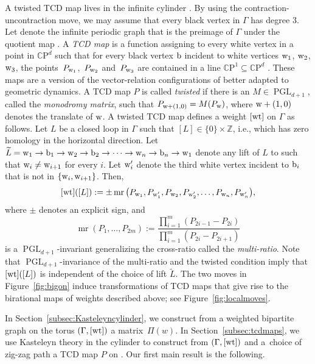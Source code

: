 \documentclass[pdftex]{sigma}
\numberwithin{equation}{section}
\newcommand{\Z}{{\mathbb Z}}
\newcommand{\R}{{\mathbb R}}
\newcommand{\CP}{{\mathbb C\mathrm P}}
\newcommand{\T}{{\mathbb T}}
\newcommand{\A}{{\mathbb A}}
\newcommand{\PGL}{\operatorname{PGL}}
\newcommand{\ra}{\rightarrow}
\newcommand{\w}{{\rm w}}
\newcommand{\bw}{{\rm b}}
\newcommand{\wt}{{\rm wt}}
\def\mr{\operatorname{mr}}
\begin{document}
	A twisted TCD map lives in the infinite cylinder \smash{$\widehat \A:= \R^2/\Z(0,1)$}. By using the contraction-uncontraction move, we may assume that every black vertex in $\Gamma$ has degree $3$. Let \smash{$\Gamma_{\widehat \A}$} denote the infinite periodic graph that is the preimage of $\Gamma$ under the quotient map \smash{$\widehat \A\ra \T$}. A \textit{TCD map} is a function \smash{$P\colon W\bigl(\Gamma_{\widehat \A}\bigr) \ra \CP^d$} assigning to every white vertex in \smash{$\Gamma_{\widehat \A}$} a point in $\CP^d$ such that for every black vertex $\bw$ incident to white vertices $\w_1$, $\w_2$, $\w_3$, the points~$P_{\w_1}$,~$P_{\w_2}$ and~$P_{\w_3}$ are contained in a line $\CP^1 \subseteq \CP^d$ \cite{AGR}. These maps are a version of the vector-relation configurations of \cite{AGPR} better adapted to geometric dynamics. A TCD map $P$ is called \textit{twisted} if there is an $M \in \PGL_{d+1}$, called the \textit{monodromy matrix}, such that $P_{\w+(1,0)} = M(P_\w)$, where $\w+(1,0)$ denotes the translate of $\w$.
	A twisted TCD map defines a weight $[\wt]$ on $\Gamma$ as follows. Let $L$ be a closed loop in $\Gamma$ such that $[L] \in \{0\} \times \Z$, i.e., which has zero homology in the horizontal direction. Let $\widetilde L={\rm w}_1 \ra {\rm b}_1 \ra {\rm w}_2 \ra {\rm b}_2 \ra \cdots \ra {\rm w}_n \ra {\rm b}_n \ra {\rm w}_1$ denote any lift of $L$ to \smash{$\Gamma_{\widehat \A}$} such that ${\rm w}_i \neq {\rm w}_{i+1}$ for every $i$. Let ${\rm w}_i'$ denote the third white vertex incident to ${\rm b}_i$ that is not in $\{{\rm w}_i,{\rm w}_{i+1}\}$. Then,
	\[
	[{\rm wt}]([L]) := \pm \mr{\big(P_{{\rm w}_1}, P_{{\rm w}_1'},P_{{\rm w}_2},P_{{\rm w}_2'},\dots, P_{{\rm w}_n},P_{{\rm w}_n'}\big)},
	\]
	where $\pm$ denotes an explicit sign, and
	\begin{equation*}
		\mr(P_1,\dots,P_{2m}):=\frac{\prod\limits_{i=1}^m (P_{2i-1}-P_{2i})}{\prod\limits_{i=1}^m (P_{2i}-P_{2i+1})}
	\end{equation*}
	is a $\PGL_{d+1}$-invariant generalizing the cross-ratio called the \textit{multi-ratio}. Note that $\PGL_{d+1}$-invariance of the multi-ratio and the twisted condition imply that $[{\rm wt}]([L])$ is independent of the choice of lift $\widetilde L$. The two moves in Figure~\ref{fig:bigon}
	induce transformations of TCD maps that give rise to the birational maps of weights described above; see Figure~\ref{fig:localmoves}.
	
	In Section~\ref{subsec:Kasteleyncylinder}, we construct from a weighted bipartite graph on the torus $(\Gamma,[\wt])$ a matrix~$\Pi(w)$. In Section~\ref{subsec:tcdmaps}, we use Kasteleyn theory in the cylinder to construct from $(\Gamma,[\wt])$ and a~choice of zig-zag path a TCD map $P$ on \smash{$\widehat \A$}. Our first main result is the following.
	
\end{document}
